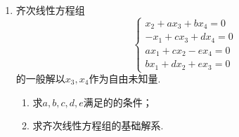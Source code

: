 \begin{enumerate}
    \item 齐次线性方程组\[\begin{cases}
                  x_2+ax_3+bx_4=0  \\
                  -x_1+cx_3+dx_4=0 \\
                  ax_1+cx_2-ex_4=0 \\
                  bx_1+dx_2+ex_3=0
              \end{cases}\]的一般解以$x_3,x_4$作为自由未知量.
          \begin{enumerate}
              \item 求$a,b,c,d,e$满足的的条件；

              \item 求齐次线性方程组的基础解系.
          \end{enumerate}
\end{enumerate}

